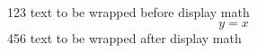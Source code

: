123 text to 
    be
 wrapped before display math
 \[ y = x\]
456 text to 
    be
 wrapped after display math
